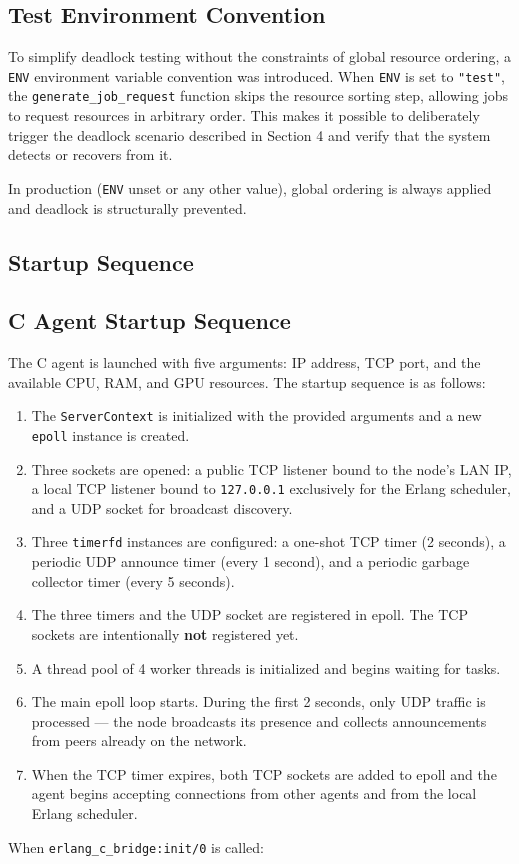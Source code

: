 \documentclass[12pt,a4paper]{article}
\begin{document}
\subsection{Test Environment Convention}

To simplify deadlock testing without the constraints of global resource ordering,
a \texttt{ENV} environment variable convention was introduced. When \texttt{ENV}
is set to \texttt{"test"}, the \texttt{generate\_job\_request} function skips
the resource sorting step, allowing jobs to request resources in arbitrary order.
This makes it possible to deliberately trigger the deadlock scenario described
in Section 4 and verify that the system detects or recovers from it.

In production (\texttt{ENV} unset or any other value), global ordering is always
applied and deadlock is structurally prevented.

\subsection{Startup Sequence}

\subsection{C Agent Startup Sequence}

The C agent is launched with five arguments: IP address, TCP port, and the 
available CPU, RAM, and GPU resources. The startup sequence is as follows:

\begin{enumerate}
    \item The \texttt{ServerContext} is initialized with the provided arguments and a new \texttt{epoll} instance is created.
    \item Three sockets are opened: a public TCP listener bound to the node's LAN IP, a local TCP listener bound to \texttt{127.0.0.1} exclusively 
 for the Erlang scheduler, and a UDP socket for broadcast discovery.
    \item Three \texttt{timerfd} instances are configured: a one-shot TCP timer (2 seconds), a periodic UDP announce timer (every 1 second), and a 
 periodic garbage collector timer (every 5 seconds).
    \item The three timers and the UDP socket are registered in epoll. The TCP sockets are intentionally \textbf{not} registered yet.
    \item A thread pool of 4 worker threads is initialized and begins waiting for tasks.
    \item The main epoll loop starts. During the first 2 seconds, only UDP traffic is processed — the node broadcasts its presence and collects     announcements from peers already on the network.
    \item When the TCP timer expires, both TCP sockets are added to epoll and the agent begins accepting connections from other agents and from the 
local Erlang scheduler.
\end{enumerate}
When \texttt{erlang\_c\_bridge:init/0} is called:
\end{document}
